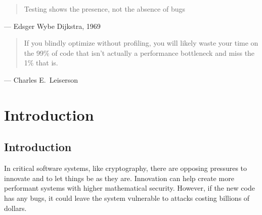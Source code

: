 \begin{quote}
  Testing shows the presence, not the absence of bugs
\end{quote}
\begin{flushright}
  --- Edsger Wybe Dijkstra, 1969~\cite{naur1969software}
\end{flushright}

\begin{quote}
  If you blindly optimize without profiling, you will likely waste your time on the 99\% of code that isn't actually a performance bottleneck and miss the 1\% that is.
\end{quote}
\begin{flushright}
  --- Charles E.~Leiserson~\cite{Profiling2020Leiserson}
\end{flushright}


\chapter{Introduction}\label{ch:intro}

\section{Introduction}\label{sec:intro:intro}




In critical software systems, like cryptography, there are opposing pressures to innovate and to let things be as they are.
Innovation can help create more performant systems with higher mathematical security.
However, if the new code has any bugs, it could leave the system vulnerable to attacks costing billions of dollars.

